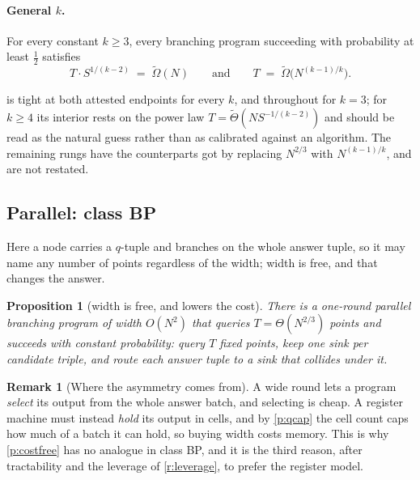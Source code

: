 \documentclass[11pt]{article}
\theoremstyle{plain}
\newtheorem{proposition}{Proposition}
\theoremstyle{definition}
\newtheorem{remark}{Remark}
\newenvironment{conj}[1]%
  {\renewcommand{\theinnerconj}{#1}%
   \def\theHinnerconj{conj.\arabic{innerconj}}\innerconj}{\endinnerconj}
\newcommand{\cls}[1]{\textsf{#1}}   %
\begin{document}
\paragraph{General $k$.}

\begin{conj}{BS4-k}[branching programs, general $k$]\label{BS4-k}
For every constant $k \geq 3$, every branching program succeeding with
probability at least $\tfrac12$ satisfies
\[
  T \cdot S^{1/(k-2)} \;=\; \tilde\Omega(N)
  \qquad\text{and}\qquad
  T \;=\; \tilde\Omega\bigl(N^{(k-1)/k}\bigr).
\]
\end{conj}

 is tight at both attested endpoints for every $k$, and
throughout for $k=3$; for $k\geq4$ its interior rests on the power law
$T=\tilde\Theta(NS^{-1/(k-2)})$ and should be read as the natural guess
rather than as calibrated against an algorithm.  The remaining rungs have
the counterparts got by replacing $N^{2/3}$ with $N^{(k-1)/k}$, and are not
restated.

\subsection{Parallel: class \cls{BP}}\label{sec:BP}

Here a node carries a $q$-tuple and branches on the whole answer tuple, so
it may name any number of points regardless of the width; width is free, and
that changes the answer.

\begin{proposition}[width is free, and lowers the cost]\label{p:parbp}
There is a one-round parallel branching program of width $O(N^{2})$ that
queries $T = \Theta(N^{2/3})$ points and succeeds with constant
probability: query $T$ fixed points, keep one sink per candidate triple, and
route each answer tuple to a sink that collides under it.
\end{proposition}
\begin{remark}[Where the asymmetry comes from]\label{r:asym}
A wide round lets a program \emph{select} its output from the whole answer
batch, and selecting is cheap.  A register machine must instead \emph{hold}
its output in cells, and by \cref{p:qcap} the cell count caps how much of a
batch it can hold, so buying width costs memory.  This is why
\cref{p:costfree} has no analogue in class \cls{BP}, and it is the third
reason, after tractability and the leverage of \cref{r:leverage}, to prefer
the register model.
\end{remark}
\end{document}
